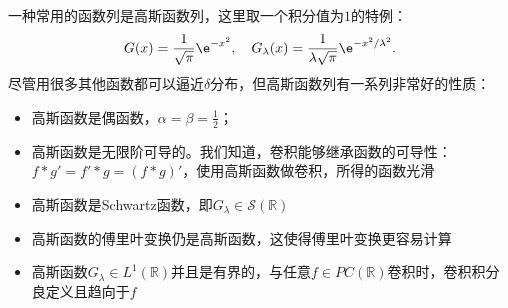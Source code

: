 一种常用的函数列是高斯函数列，这里取一个积分值为$1$的特例：
\begin{equation}
    G(x)=\frac{1}{\sqrt{\pi}}\e^{-x^2},\quad G_\lambda(x)=\frac{1}{\lambda\sqrt{\pi}}\e^{-x^2/\lambda^2}.
\end{equation}
尽管用很多其他函数都可以逼近$\delta$分布，但高斯函数列有一系列非常好的性质：
\begin{itemize}
    \item 高斯函数是偶函数，$\alpha=\beta=\displaystyle\frac{1}{2}$；
    \item 高斯函数是无限阶可导的。我们知道，卷积能够继承函数的可导性：$f*g'=f'*g=(f*g)'$，使用高斯函数做卷积，所得的函数光滑
    \item 高斯函数是Schwartz函数，即$G_\lambda\in\mathcal{S}(\mathbb{R})$
    \item 高斯函数的傅里叶变换仍是高斯函数，这使得傅里叶变换更容易计算
    \item 高斯函数$G_\lambda\in L^1(\mathbb{R})$并且是有界的，与任意$f\in PC(\mathbb{R})$卷积时，卷积积分良定义且趋向于$f$
\end{itemize}

